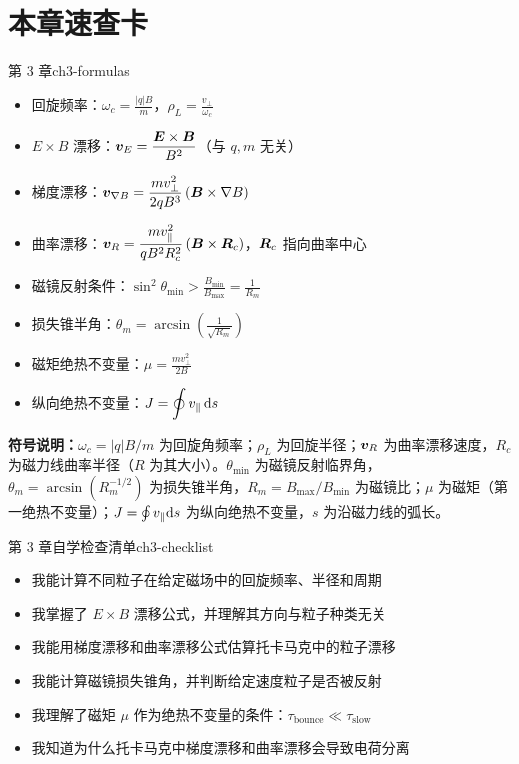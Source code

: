 \section*{本章速查卡}
{}
\begin{formulabox}{第 3 章}{ch3-formulas}
\begin{itemize}[leftmargin=*,itemsep=0pt]
\item 回旋频率：$\displaystyle\omega_c = \frac{|q|B}{m}$，$\displaystyle \rho_L = \frac{v_{\perp}}{\omega_c}$
\item $E\times B$ 漂移：$\displaystyle\bm{v}_E = \frac{\bm{E}\times\bm{B}}{B^2}$（与 $q,m$ 无关）
\item 梯度漂移：$\displaystyle\bm{v}_{\nabla B} = \frac{m v_{\perp}^2}{2qB^3}\,(\bm{B}\times\nabla B)$
\item 曲率漂移：$\displaystyle\bm{v}_R = \frac{m v_{\parallel}^2}{qB^2R_c^2}\,(\bm{B}\times\bm{R}_c)$，$\bm{R}_c$ 指向曲率中心
\item 磁镜反射条件：$\displaystyle\sin^2\theta_{\min} > \frac{B_{\min}}{B_{\max}} = \frac{1}{R_m}$
\item 损失锥半角：$\displaystyle\theta_m = \arcsin\!\left(\frac{1}{\sqrt{R_m}}\right)$
\item 磁矩绝热不变量：$\displaystyle\mu = \frac{m v_{\perp}^2}{2B}$
\item 纵向绝热不变量：$\displaystyle J = \oint v_{\parallel}\,\mathrm{d} s$
\end{itemize}
\textbf{符号说明：}$\omega_c=|q|B/m$ 为回旋角频率；$\rho_L$ 为回旋半径；$\bm{v}_R$ 为曲率漂移速度，$R_c$ 为磁力线曲率半径（$R$ 为其大小）。$\theta_{\min}$ 为磁镜反射临界角，$\theta_m=\arcsin(R_m^{-1/2})$ 为损失锥半角，$R_m=B_{\max}/B_{\min}$ 为磁镜比；$\mu$ 为磁矩（第一绝热不变量）；$J=\oint v_\parallel\mathrm{d} s$ 为纵向绝热不变量，$s$ 为沿磁力线的弧长。
\end{formulabox}

\begin{checklistbox}{第 3 章自学检查清单}{ch3-checklist}
\begin{itemize}[leftmargin=*,label=$\square$]
\item 我能计算不同粒子在给定磁场中的回旋频率、半径和周期
\item 我掌握了 $E\times B$ 漂移公式，并理解其方向与粒子种类无关
\item 我能用梯度漂移和曲率漂移公式估算托卡马克中的粒子漂移
\item 我能计算磁镜损失锥角，并判断给定速度粒子是否被反射
\item 我理解了磁矩 $\mu$ 作为绝热不变量的条件：$\tau_{\text{bounce}}\ll\tau_{\text{slow}}$
\item 我知道为什么托卡马克中梯度漂移和曲率漂移会导致电荷分离
\end{itemize}
\end{checklistbox}


\endinput
